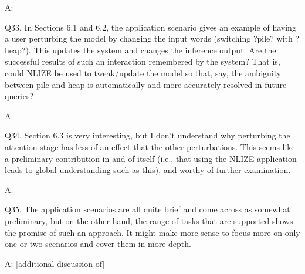 A:

Q33, In Sections 6.1 and 6.2, the application scenario gives an example of having a user perturbing the model by changing the input words (switching ?pile? with ?heap?). This updates the system and changes the inference output. Are the successful results of such an interaction remembered by the system? That is, could NLIZE be used to tweak/update the model so that, say, the ambiguity between pile and heap is automatically and more accurately resolved in future queries?

A:

Q34, Section 6.3 is very interesting, but I don't understand why perturbing the attention stage has less of an effect that the other perturbations. This seems like a preliminary contribution in and of itself (i.e., that using the NLIZE application leads to global understanding such as this), and worthy of further examination.

A:

Q35, The application scenarios are all quite brief and come across as somewhat preliminary, but on the other hand, the range of tasks that are supported shows the promise of such an approach. It might make more sense to focus more on only one or two scenarios and cover them in more depth.

A: [additional discussion of]
